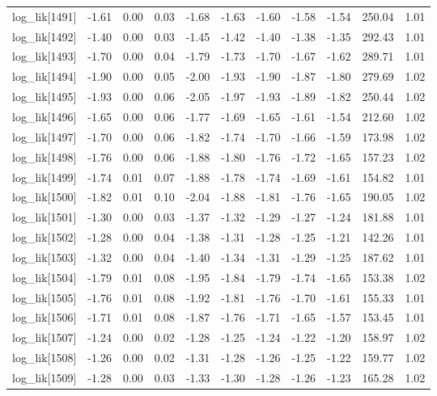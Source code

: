 \begin{table}[ht]
\begin{tabular}{rrrrrrrrrrr}
  log\_lik[1491] & -1.61 & 0.00 & 0.03 & -1.68 & -1.63 & -1.60 & -1.58 & -1.54 & 250.04 & 1.01 \\ 
  log\_lik[1492] & -1.40 & 0.00 & 0.03 & -1.45 & -1.42 & -1.40 & -1.38 & -1.35 & 292.43 & 1.01 \\ 
  log\_lik[1493] & -1.70 & 0.00 & 0.04 & -1.79 & -1.73 & -1.70 & -1.67 & -1.62 & 289.71 & 1.01 \\ 
  log\_lik[1494] & -1.90 & 0.00 & 0.05 & -2.00 & -1.93 & -1.90 & -1.87 & -1.80 & 279.69 & 1.02 \\ 
  log\_lik[1495] & -1.93 & 0.00 & 0.06 & -2.05 & -1.97 & -1.93 & -1.89 & -1.82 & 250.44 & 1.02 \\ 
  log\_lik[1496] & -1.65 & 0.00 & 0.06 & -1.77 & -1.69 & -1.65 & -1.61 & -1.54 & 212.60 & 1.02 \\ 
  log\_lik[1497] & -1.70 & 0.00 & 0.06 & -1.82 & -1.74 & -1.70 & -1.66 & -1.59 & 173.98 & 1.02 \\ 
  log\_lik[1498] & -1.76 & 0.00 & 0.06 & -1.88 & -1.80 & -1.76 & -1.72 & -1.65 & 157.23 & 1.02 \\ 
  log\_lik[1499] & -1.74 & 0.01 & 0.07 & -1.88 & -1.78 & -1.74 & -1.69 & -1.61 & 154.82 & 1.01 \\ 
  log\_lik[1500] & -1.82 & 0.01 & 0.10 & -2.04 & -1.88 & -1.81 & -1.76 & -1.65 & 190.05 & 1.02 \\ 
  log\_lik[1501] & -1.30 & 0.00 & 0.03 & -1.37 & -1.32 & -1.29 & -1.27 & -1.24 & 181.88 & 1.01 \\ 
  log\_lik[1502] & -1.28 & 0.00 & 0.04 & -1.38 & -1.31 & -1.28 & -1.25 & -1.21 & 142.26 & 1.01 \\ 
  log\_lik[1503] & -1.32 & 0.00 & 0.04 & -1.40 & -1.34 & -1.31 & -1.29 & -1.25 & 187.62 & 1.01 \\ 
  log\_lik[1504] & -1.79 & 0.01 & 0.08 & -1.95 & -1.84 & -1.79 & -1.74 & -1.65 & 153.38 & 1.02 \\ 
  log\_lik[1505] & -1.76 & 0.01 & 0.08 & -1.92 & -1.81 & -1.76 & -1.70 & -1.61 & 155.33 & 1.01 \\ 
  log\_lik[1506] & -1.71 & 0.01 & 0.08 & -1.87 & -1.76 & -1.71 & -1.65 & -1.57 & 153.45 & 1.01 \\ 
  log\_lik[1507] & -1.24 & 0.00 & 0.02 & -1.28 & -1.25 & -1.24 & -1.22 & -1.20 & 158.97 & 1.02 \\ 
  log\_lik[1508] & -1.26 & 0.00 & 0.02 & -1.31 & -1.28 & -1.26 & -1.25 & -1.22 & 159.77 & 1.02 \\ 
  log\_lik[1509] & -1.28 & 0.00 & 0.03 & -1.33 & -1.30 & -1.28 & -1.26 & -1.23 & 165.28 & 1.02 \\ 

\end{tabular}
\end{table}
